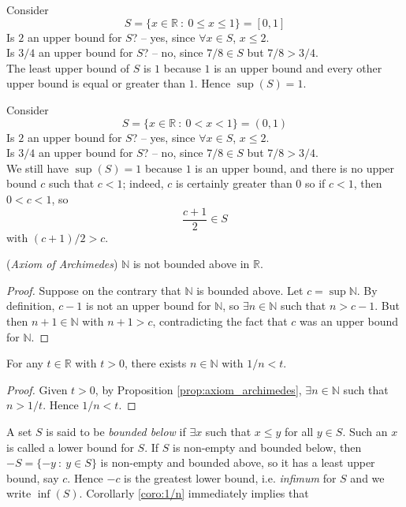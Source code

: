 \documentclass[10pt, a4paper, twoside]{report}
\begin{document}
\begin{example}
    Consider \[S=\{x\in\mathbb{R}\::\:0\leq x\leq 1\}=[0,1]\]
    Is \(2\) an upper bound for \(S\)? -- yes, since \(\forall x\in S\), \(x\leq 2\). \\ 
    Is \(3/4\) an upper bound for \(S\)? -- no, since \(7/8\in S\) but \(7/8>3/4\). \\
    The least upper bound of \(S\) is \(1\) because \(1\) is an upper bound and every other upper bound is equal or greater than \(1\). Hence \(\sup(S)=1\).
\end{example}
\begin{example}
    Consider 
    \[S=\{x\in\mathbb{R}\::\:0<x<1\}=(0,1)\]
    Is \(2\) an upper bound for \(S\)? -- yes, since \(\forall x\in S\), \(x\leq 2\). \\ 
    Is \(3/4\) an upper bound for \(S\)? -- no, since \(7/8\in S\) but \(7/8>3/4\). \\
    We still have \(\sup(S)=1\) because \(1\) is an upper bound, and there is no upper bound \(c\) such that \(c<1\); indeed, \(c\) is certainly greater than \(0\) so if \(c<1\), then \(0<c<1\), so 
    \[\frac{c+1}{2}\in S\]
    with \((c+1)/2>c\).
\end{example}
\begin{proposition}
    (\emph{Axiom of Archimedes})
    \(\mathbb{N}\) is not bounded above in \(\mathbb{R}\).
    \label{prop:axiom_archimedes}
\end{proposition}
\begin{proof}
    Suppose on the contrary that \(\mathbb{N}\) is bounded above. Let \(c=\sup\mathbb{N}\).
    By definition, \(c-1\) is not an upper bound for \(\mathbb{N}\), so \(\exists n\in\mathbb{N}\) such that \(n>c-1\). But then \(n+1\in\mathbb{N}\) with \(n+1>c\), contradicting the fact that \(c\) was an upper bound for \(\mathbb{N}\).
\end{proof}
\begin{corollary}
    For any \(t\in\mathbb{R}\) with \(t>0\), there exists \(n\in\mathbb{N}\) with \(1/n<t\).
    \label{coro:1/n}
\end{corollary}
\begin{proof}
    Given \(t>0\), by Proposition \ref{prop:axiom_archimedes}, \(\exists n\in\mathbb{N}\) such that \(n>1/t\). Hence \(1/n<t\).
\end{proof}
A set \(S\) is said to be \emph{bounded below} if \(\exists x\) such that \(x\leq y\) for all \(y\in S\). Such an \(x\) is called a lower bound for \(S\). If \(S\) is non-empty and bounded below, then \(-S=\{-y\::\:y\in S\}\) is non-empty and bounded above, so it has a least upper bound, say \(c\). Hence \(-c\) is the greatest lower bound, i.e. \emph{infimum} for \(S\) and we write \(\inf(S)\). Corollarly \ref{coro:1/n} immediately implies that 
\end{document}
